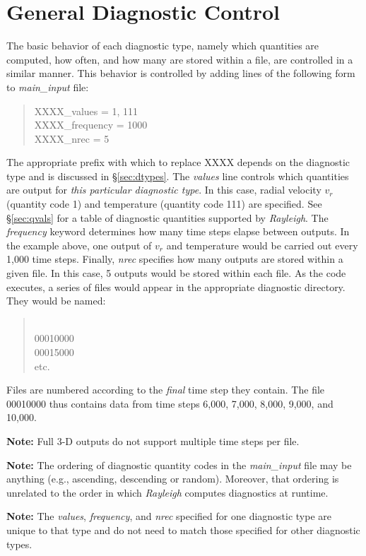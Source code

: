 \documentclass[12pt,letterpaper]{article}
\begin{document}
\section{General Diagnostic Control}\label{sec:controls}
The basic behavior of each diagnostic type, namely which quantities are computed, how often, and how many are stored within a file, are controlled in a similar manner.  This behavior is controlled by adding lines of the following form to \textit{main\_input} file:
\blockquote{\noindent XXXX\_values = 1, 111
\\
\noindent XXXX\_frequency = 1000
\\
\noindent XXXX\_nrec = 5
}
The appropriate prefix with which to replace XXXX depends on the diagnostic type and is discussed in \S\ref{sec:dtypes}. The \textit{values} line controls which quantities are output for \textit{this particular diagnostic type}.  In this case, radial velocity $v_r$ (quantity code 1) and temperature (quantity code 111) are specified.  See \S\ref{sec:qvals} for a table of diagnostic quantities supported by \textit{Rayleigh}.  The \textit{frequency} keyword determines how many time steps elapse between outputs.  In the example above, one output of $v_r$ and temperature would be carried out every 1,000 time steps.  Finally, \textit{nrec} specifies how many outputs are stored within a given file.  In this case, 5 outputs would be stored within each file.  As the code executes, a series of files would appear in the appropriate diagnostic directory.  They would be named:
\blockquote{
\\
00010000
\\
00015000
\\
etc.
}
Files are numbered according to the \textit{final} time step they contain.  The file 00010000 thus contains data from time steps 6,000, 7,000, 8,000, 9,000, and 10,000.  

\noindent\textbf{Note: } Full 3-D outputs do not support multiple time steps per file.

\noindent\textbf{Note: } The ordering of diagnostic quantity codes in the \textit{main\_input} file may be anything (e.g., ascending, descending or random).  Moreover, that ordering is unrelated to the order in which \textit{Rayleigh} computes diagnostics at runtime.

\noindent\textbf{Note: } The \textit{values}, \textit{frequency}, and \textit{nrec} specified for one diagnostic type are unique to that type and do not need to match those specified for other diagnostic types.
\end{document}
